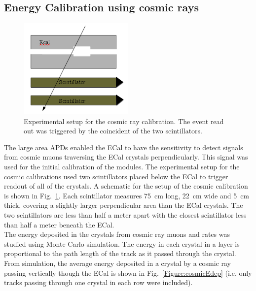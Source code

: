\subsection{Energy Calibration using cosmic rays}
\begin{figure}[htb]
  \centering
      \includegraphics[width=0.5\textwidth]{pics/performance/cosmicschematic.png}
  \caption[Setup for ECal cosmic ray calibration]{Experimental setup for the cosmic ray calibration. The event read out was triggered by the coincident of the two scintillators.}
  \label{Figure:cosmicScheme}
\end{figure}
The large area APDs enabled the ECal to have the sensitivity to detect signals from cosmic muons traversing the ECal crystals perpendicularly. This signal was used for the initial calibration of the modules. The experimental setup for the cosmic calibrations used two scintillators placed below the ECal to trigger readout of all of the crystals. A schematic for the setup of the cosmic calibration is shown in Fig.~\ref{Figure:cosmicScheme}. Each scintillator measures 75~cm long, 22~cm wide and 5~cm thick, covering a slightly larger perpendicular area than the ECal crystals. The two scintillators are less than half a meter apart with the closest scintillator less than half a meter beneath the ECal. \\
\indent The energy deposited in the crystals from cosmic ray muons and rates was studied using Monte Carlo simulation. The energy in each crystal in a layer is proportional to the path length of the track as it passed through the crystal. From simulation, the average energy deposited in a crystal by a cosmic ray passing vertically though the ECal is shown in Fig.~\ref{Figure:cosmicEdep}  (i.e. only tracks passing through one crystal in each row were included).

